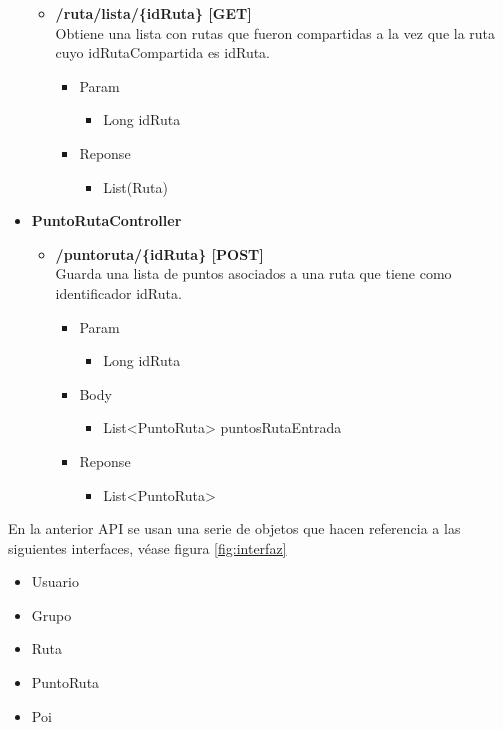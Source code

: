 \begin{itemize}
\begin{itemize}
\item  \textbf{/ruta/lista/\{idRuta\} [GET]}\\
Obtiene una lista con rutas que fueron compartidas a la vez que la ruta cuyo idRutaCompartida es idRuta.
\begin{itemize}
\item Param
\begin{itemize}
\item Long idRuta
\end{itemize}
\item Reponse
\begin{itemize}
\item List(Ruta)
\end{itemize}
\end{itemize}
\end{itemize}




% 
\item \textbf{PuntoRutaController}


\begin{itemize}
\item \textbf{ /puntoruta/\{idRuta\} [POST]}\\
Guarda una lista de puntos asociados a una ruta que tiene como identificador idRuta.
\begin{itemize}
\item Param
\begin{itemize}
\item Long idRuta
\end{itemize}
\item Body
\begin{itemize}
\item List<PuntoRuta> puntosRutaEntrada
\end{itemize}
\item Reponse
\begin{itemize}
\item List<PuntoRuta>
\end{itemize}
\end{itemize}
\end{itemize}
\end{itemize}

En la anterior API se usan una serie de objetos que hacen referencia a las siguientes interfaces, véase figura \ref{fig:interfaz}
\begin{itemize}
 \item Usuario
 \item Grupo  
 \item Ruta 
 \item PuntoRuta
 \item Poi 
\end{itemize}

